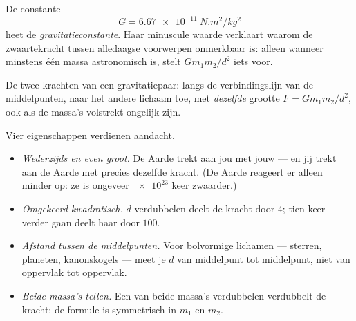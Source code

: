 \begin{definition}[De gravitatieconstante]\label{def:g10:universal-gravitation:constant}
De constante
\[
G = \qty{6.67e-11}{N.m^2/kg^2}
\]
heet de \emph{gravitatieconstante}. Haar
minuscule waarde verklaart waarom de zwaartekracht tussen alledaagse
voorwerpen onmerkbaar is: alleen wanneer minstens één massa astronomisch
is, stelt $G m_1 m_2 / d^2$ iets voor.
\end{definition}

\begin{omfigure}

{\small De twee krachten van een gravitatiepaar: langs de
verbindingslijn van de middelpunten, naar het andere lichaam toe, met
\emph{dezelfde} grootte $F = G m_1 m_2 / d^2$, ook als de massa's
volstrekt ongelijk zijn.}
\end{omfigure}

\begin{remark}\label{rem:g10:universal-gravitation:reading}
Vier eigenschappen verdienen aandacht.
\begin{itemize}
  \item \emph{Wederzijds en even groot.} De Aarde trekt aan jou met jouw
         --- en jij trekt aan de Aarde met precies dezelfde
        kracht. (De Aarde reageert er alleen minder op: ze is ongeveer
        $\num{e23}$ keer zwaarder.)
  \item \emph{Omgekeerd kwadratisch.} $d$ verdubbelen deelt de kracht
        door $4$; tien keer verder gaan deelt haar door $100$.
  \item \emph{Afstand tussen de middelpunten.} Voor bolvormige lichamen
        --- sterren, planeten, kanonskogels --- meet je $d$ van
        middelpunt tot middelpunt, niet van oppervlak tot oppervlak.
  \item \emph{Beide massa's tellen.} Een van beide massa's verdubbelen
        verdubbelt de kracht; de formule is symmetrisch in $m_1$ en
        $m_2$.
\end{itemize}
\end{remark}

